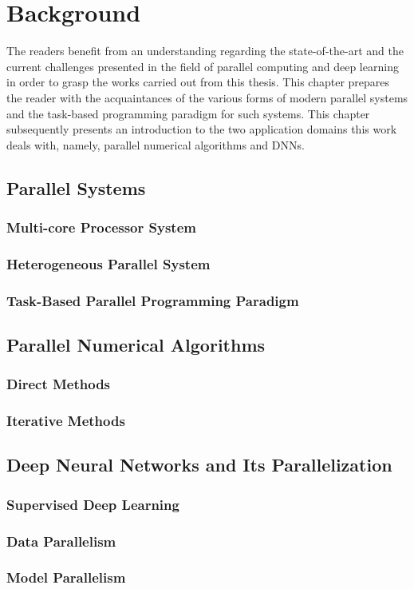 \chapter{Background}
\label{chap:background}

The readers benefit from an understanding regarding the state-of-the-art and 
the current challenges presented in the field of parallel computing and deep 
learning in order to grasp the works carried out from this thesis.
This chapter prepares the reader with the acquaintances of the various forms of 
modern parallel systems and the task-based programming paradigm for such systems. 
This chapter subsequently presents an introduction to the two application domains
this work deals with, namely, parallel numerical algorithms and DNNs.

\section{Parallel Systems}
\subsection{Multi-core Processor System}
\subsection{Heterogeneous Parallel System}
\subsection{Task-Based Parallel Programming Paradigm}

\section{Parallel Numerical Algorithms}
\subsection{Direct Methods}
\subsection{Iterative Methods}

\section{Deep Neural Networks and Its Parallelization}
\subsection{Supervised Deep Learning}
\subsection{Data Parallelism}
\subsection{Model Parallelism}
